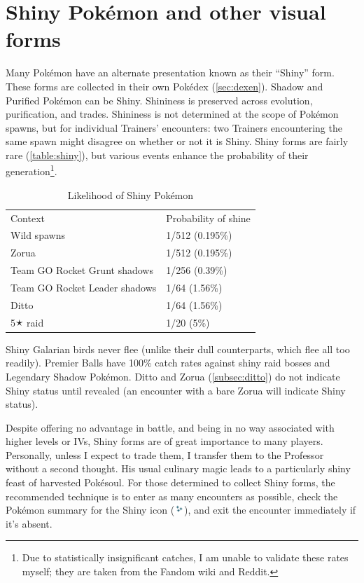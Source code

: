 \section{Shiny Pokémon and other visual forms}
\label{sec:shiny}
Many Pokémon have an alternate presentation known as their ``Shiny'' form.
These forms are collected in their own Pokédex (\autoref{sec:dexen}).
Shadow and Purified Pokémon can be Shiny.
Shininess is preserved across evolution, purification, and trades.
Shininess is not determined at the scope of Pokémon spawns, but for individual
  Trainers' encounters: two Trainers encountering the same spawn might disagree
  on whether or not it is Shiny.
Shiny forms are fairly rare (\autoref{table:shiny}), but various events
  enhance the probability of their generation\footnote{Due to statistically insignificant catches, I am unable to validate these rates myself; they are taken from the Fandom wiki and Reddit.}.
\begin{table}[ht]
\begin{center}
\begin{tabular}{ll}
Context & Probability of shine \\
\Midrule
  Wild spawns & 1/512 (0.195\%) \\
  Zorua & 1/512 (0.195\%) \\
  Team GO Rocket Grunt shadows & 1/256 (0.39\%) \\
  Team GO Rocket Leader shadows & 1/64 (1.56\%) \\
  Ditto & 1/64 (1.56\%)\\
  5🟉 raid & 1/20 (5\%) \\
\end{tabular}
\end{center}
  \caption{Likelihood of Shiny Pokémon}
\label{table:shiny}
\end{table}
Shiny Galarian birds never flee (unlike their dull counterparts, which flee all too readily).
Premier Balls have 100\% catch rates against shiny raid bosses and Legendary Shadow Pokémon.
Ditto and Zorua (\autoref{subsec:ditto}) do not indicate Shiny status until revealed (an encounter
  with a bare Zorua will indicate Shiny status).

Despite offering no advantage in battle, and being in no way associated with
  higher levels or IVs, Shiny forms are of great importance to many players.
Personally, unless I expect to trade them, I transfer them to the Professor
  without a second thought.
His usual culinary magic leads to a particularly shiny feast of harvested Pokésoul.
For those determined to collect Shiny forms, the recommended technique
  is to enter as many encounters as possible, check the Pokémon summary
  for the Shiny icon (\includegraphics[width=1em,keepaspectratio]{images/shiny.png}),
  and exit the encounter immediately if it's absent.

